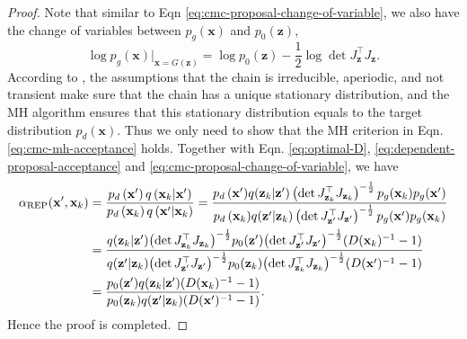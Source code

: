 \documentclass{article} %
\newcommand{\bx}{\mathbf{x}}
\newcommand{\bz}{\mathbf{z}}
\newcommand{\<}{\left\langle}
\renewcommand{\>}{\right\rangle}
\begin{document}
\begin{proof}
Note that similar to Eqn \eqref{eq:cmc-proposal-change-of-variable},  we also have the change of variables between $p_g(\bx)$ and $p_0(\bz)$,
\begin{equation}
\log p_g(\bx)\rvert_{\bx=G(\bz)}=\log p_0(\bz) - \frac{1}{2} \log \det J_{\bz}^\top J_{\bz}.
\label{eq:generator-change-of-variable}
\end{equation}
According to \cite{gelman2013bayesian}, the assumptions that the chain is irreducible, aperiodic, and not transient make sure that the chain has a unique stationary distribution, and the MH algorithm ensures that this stationary distribution equals to the target distribution $p_d(\bx)$.
Thus we only need to show that the MH criterion in Eqn. \eqref{eq:cmc-mh-acceptance} holds. Together with Eqn. \eqref{eq:optimal-D}, \eqref{eq:dependent-proposal-acceptance} and \eqref{eq:cmc-proposal-change-of-variable}, we have
\begin{equation}
\begin{aligned}
\alpha_{\rm REP}(\bx',\bx_k)
&=\frac{p_d\left(\mathbf{x}^{\prime}\right)  q\left(\mathbf{x}_{k}|\bx'\right)}{p_d\left(\mathbf{x}_{k}\right)  q\left(\mathbf{x}^{\prime}|\bx_k\right)}
=\frac{{p_d\left(\mathbf{x}^{\prime}\right)}  q(\bz_k|\bz')
\left(\det J_{\bz_k}^\top J_{\bz_k}\right)^{-\frac{1}{2}}
{p_g(\bx_k)}p_g(\bx')}{{p_d\left(\mathbf{x}_{k}\right)}  q(\bz'|\bz_k)
\left(\det J_{\bz'}^\top J_{\bz'}\right)^{-\frac{1}{2}}
{p_g(\bx')}p_g(\bx_k)}\\
&=\frac{q(\bz_k|\bz'){\left(\det J_{\bz_k}^\top J_{\bz_k}\right)^{-\frac{1}{2}}}p_0(\bz'){\left(\det J_{\bz'}^\top J_{\bz'}\right)^{-\frac{1}{2}}}(D(\bx_k)^{-1}-1)}
{q(\bz'|\bz_k){\left(\det J_{\bz'}^\top J_{\bz'}\right)^{-\frac{1}{2}}}p_0(\bz_k){\left(\det J_{\bz_k}^\top J_{\bz_k}\right)^{-\frac{1}{2}}}(D(\bx')^{-1}-1)}\\
&=\frac{p_0(\bz')q(\bz_k|\bz')(D(\bx_k)^{-1}-1)}{p_0(\bz_k)q(\bz'|\bz_k)(D(\bx')^{-1}-1)}.
\end{aligned}
\label{eq:dcgan-cmc-alpha}
\end{equation}
Hence the proof is completed.
\end{proof}
\end{document}
